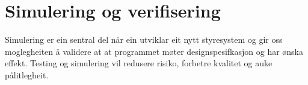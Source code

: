\chapter{Simulering og verifisering}
\thispagestyle{fancy}

Simulering er ein sentral del når ein utviklar eit nytt styresystem
og gir oss moglegheiten å validere at at programmet møter designspesifkasjon og har ønska effekt.
Testing og simulering vil redusere risiko, forbetre kvalitet og auke pålitlegheit.

